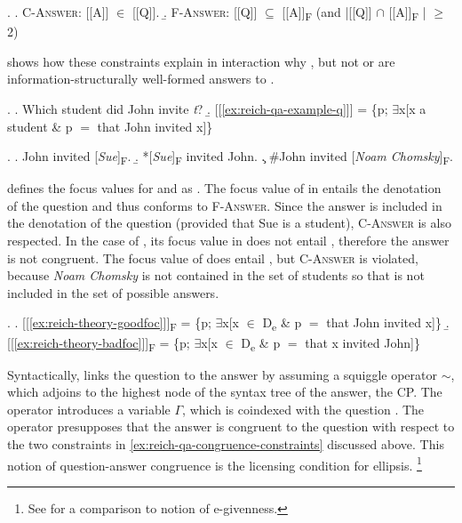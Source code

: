 \ex. \a. \textsc{C-Answer}: [[A]] $\in$ [[Q]].\label{ex:reich-qa-congruence-constraints}
\b. \textsc{F-Answer}: [[Q]] $\subseteq$ [[A]]\textsubscript{F} (and |[[Q]] $\cap$ [[A]]\textsubscript{F} | $\geq$ 2)

\citeauthor{reich2007} shows how these constraints explain in interaction why \NNext[a], but not \NNext[b] or \NNext[c] are information-structurally well-formed answers to \Next. 

\ex. \a. Which student did John invite \textit{t}? \hfill \citep[472]{reich2007} \label{ex:reich-qa-example-q}
\b. [[\ref{ex:reich-qa-example-q}]] = \{p; $\exists$x[x a student \& p $=$ that John invited x]\}

\ex. \a. John invited [\textit{Sue}]\textsubscript{F}.\label{ex:reich-theory-goodfoc} \hfill\citep[472]{reich2007}
\b. *[\textit{Sue}]\textsubscript{F} invited John. \label{ex:reich-theory-badfoc}
\c. \#John invited [\textit{Noam Chomsky}]\textsubscript{F}.  \label{ex:reich-theory-badfoc-full}

\citet[472]{reich2007} defines the focus values for \Last[a] and \Last[b] as \Next. The focus value of \Last[a] in \Next[a] entails the denotation of the question \LLast[b] and thus conforms to \textsc{F-Answer}. Since the answer is included in the denotation of the question (provided that Sue is a student), \textsc{C-Answer} is also respected. In the case of \Last[b], its focus value in \Next[b] does not entail \LLast[b], therefore the answer is not congruent. The focus value of \Last[c] does entail \LLast[b], but \textsc{C-Answer} is violated, because \textit{Noam Chomsky} is not contained in the set of students so that \Last[c] is not included in the set of possible answers.

\ex. \a. [[\ref{ex:reich-theory-goodfoc}]]\textsubscript{F} = \{p; $\exists$x[x $\in$ D\textsubscript{e} \& p $=$ that John invited x]\}
\b. [[\ref{ex:reich-theory-badfoc}]]\textsubscript{F} = \{p; $\exists$x[x $\in$ D\textsubscript{e} \& p $=$ that x invited John]\}

Syntactically, \citet[472]{reich2007} links the question to the answer by assuming a squiggle operator $\sim$, which adjoins to the highest node of the syntax tree of the answer, the CP. The operator introduces a variable $\Gamma$, which is coindexed with the question \Next. The operator presupposes that the answer is congruent to the question with respect to the two constraints in \ref{ex:reich-qa-congruence-constraints} discussed above. This notion of question-answer congruence is the licensing condition for ellipsis.%
%
\footnote{See \citet[474--477]{reich2007} for a comparison to  notion of e-givenness.}\afterfn%

